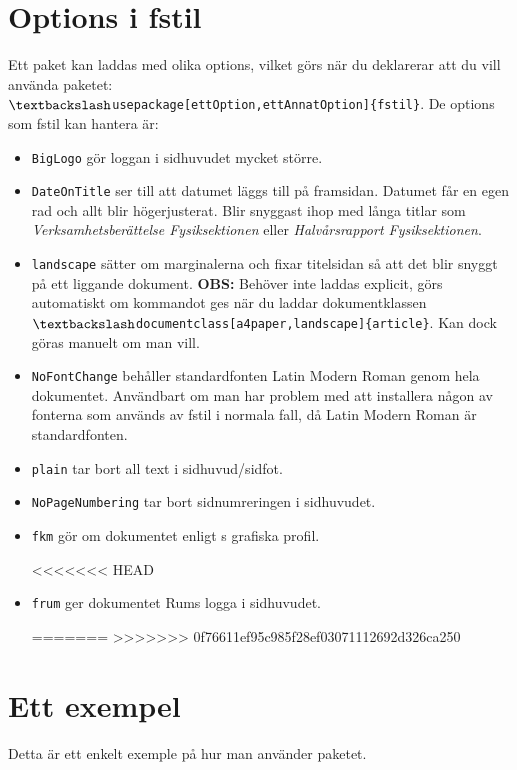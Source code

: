 \documentclass[a4paper]{article}
\newcommand{\bs}{\textbackslash}
\begin{document}
\section{Options i fstil}
Ett paket kan laddas med olika options, vilket görs när du deklarerar att du vill använda paketet:\\ \texttt{$\bs$usepackage[ettOption,ettAnnatOption]\{fstil\}}. De options som fstil kan hantera är:
\begin{itemize}
\item \texttt{BigLogo} gör loggan i sidhuvudet mycket större.

\item \texttt{DateOnTitle} ser till att datumet läggs till på framsidan. Datumet får en egen rad och allt blir högerjusterat. Blir snyggast ihop med långa titlar som \textit{Verksamhetsberättelse Fysiksektionen} eller \textit{Halvårsrapport Fysiksektionen}.

\item \texttt{landscape} sätter om marginalerna och fixar titelsidan så att det blir snyggt på ett liggande dokument. \textbf{OBS:} Behöver inte laddas explicit, görs automatiskt om kommandot ges när du laddar dokumentklassen \texttt{$\bs$documentclass[a4paper,landscape]\{article\}}. Kan dock göras manuelt om man vill.

\item \texttt{NoFontChange} behåller standardfonten Latin Modern Roman genom hela dokumentet. Användbart om man har problem med att installera någon av fonterna som används av fstil i normala fall, då Latin Modern Roman är standardfonten.

\item \texttt{plain} tar bort all text i sidhuvud/sidfot.

\item \texttt{NoPageNumbering} tar bort sidnumreringen i sidhuvudet.

\item \texttt{fkm} gör om dokumentet enligt \fkm s grafiska profil.

<<<<<<< HEAD
\item \texttt{frum} ger dokumentet \F Rums logga i sidhuvudet.

=======
>>>>>>> 0f76611ef95c985f28ef03071112692d326ca250
\end{itemize}

\section{Ett exempel}
Detta är ett enkelt exemple på hur man använder paketet.
\end{document}

